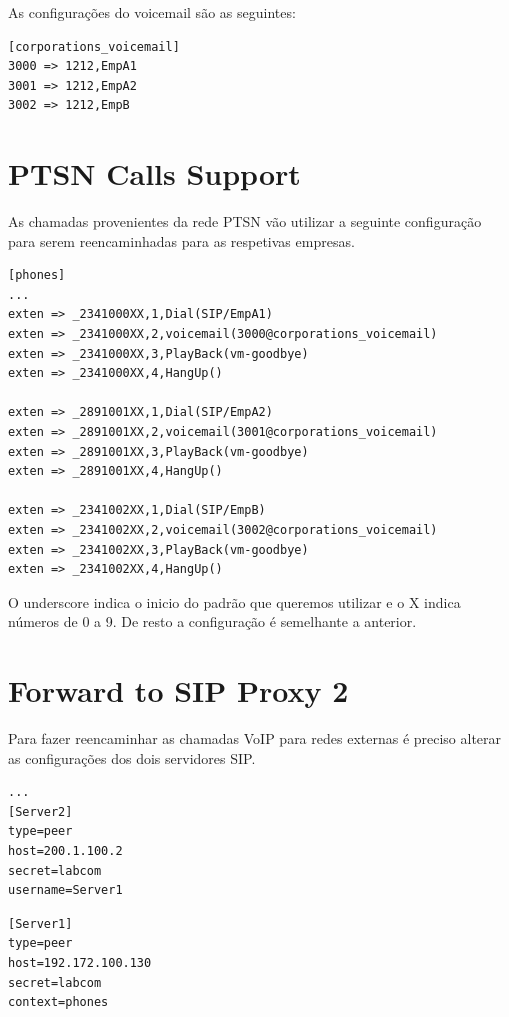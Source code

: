\documentclass[11pt,a4paper]{report}
\begin{document}
As configurações do voicemail são as seguintes:

\begin{lstlisting}[caption=SIP Proxy 1 - /etc/asterisk/voicemail.conf]
[corporations_voicemail]
3000 => 1212,EmpA1
3001 => 1212,EmpA2
3002 => 1212,EmpB
\end{lstlisting}


\section{PTSN Calls Support}

As chamadas provenientes da rede PTSN vão utilizar a seguinte configuração para serem reencaminhadas para as respetivas empresas.

\begin{lstlisting}[caption=SIP Proxy 1 - /etc/asterisk/extensions.conf]
[phones]
...
exten => _2341000XX,1,Dial(SIP/EmpA1)
exten => _2341000XX,2,voicemail(3000@corporations_voicemail)
exten => _2341000XX,3,PlayBack(vm-goodbye)
exten => _2341000XX,4,HangUp()

exten => _2891001XX,1,Dial(SIP/EmpA2)
exten => _2891001XX,2,voicemail(3001@corporations_voicemail)
exten => _2891001XX,3,PlayBack(vm-goodbye)
exten => _2891001XX,4,HangUp()

exten => _2341002XX,1,Dial(SIP/EmpB)
exten => _2341002XX,2,voicemail(3002@corporations_voicemail)
exten => _2341002XX,3,PlayBack(vm-goodbye)
exten => _2341002XX,4,HangUp()
\end{lstlisting}

O underscore indica o inicio do padrão que queremos utilizar e o X indica números de 0 a 9. De resto a configuração é semelhante a anterior.

\section{Forward to SIP Proxy 2}

Para fazer reencaminhar as chamadas VoIP para redes externas é preciso alterar as configurações dos dois servidores SIP.

\begin{lstlisting}[caption=SIP Proxy 1 - /etc/asterisk/sip.conf]
...
[Server2]
type=peer
host=200.1.100.2
secret=labcom
username=Server1
\end{lstlisting}

\begin{lstlisting}[caption=SIP Proxy 2 - /etc/asterisk/sip.conf]
[Server1]
type=peer
host=192.172.100.130
secret=labcom
context=phones
\end{lstlisting}
\end{document}
